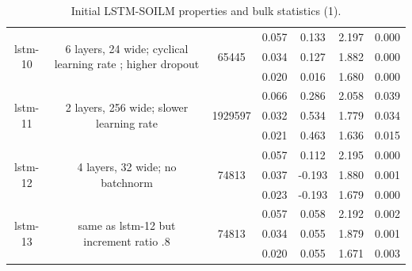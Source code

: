 \begin{table}[H]
\begin{sideways}
\begin{tabular}{c|c|c|c|c|c|c }
\hline
\multirow{3}{6em}{lstm-10} & \multirow{3}{16em}{6 layers, 24 wide; cyclical learning rate ; higher dropout} & \multirow{3}{4em}{65445} & 0.057 & 0.133 & 2.197 & 0.000 \\ & & & 0.034 & 0.127 & 1.882 & 0.000 \\ & & & 0.020 & 0.016 & 1.680 & 0.000 \\
\hline
\multirow{3}{6em}{lstm-11} & \multirow{3}{16em}{2 layers, 256 wide; slower learning rate} & \multirow{3}{4em}{1929597} & 0.066 & 0.286 & 2.058 & 0.039 \\ & & & 0.032 & 0.534 & 1.779 & 0.034 \\ & & & 0.021 & 0.463 & 1.636 & 0.015 \\
\hline
\multirow{3}{6em}{lstm-12} & \multirow{3}{16em}{4 layers, 32 wide; no batchnorm} & \multirow{3}{4em}{74813} & 0.057 & 0.112 & 2.195 & 0.000 \\ & & & 0.037 & -0.193 & 1.880 & 0.001 \\ & & & 0.023 & -0.193 & 1.679 & 0.000 \\
\hline
\multirow{3}{6em}{lstm-13} & \multirow{3}{16em}{same as lstm-12 but increment ratio .8} & \multirow{3}{4em}{74813} & 0.057 & 0.058 & 2.192 & 0.002 \\ & & & 0.034 & 0.055 & 1.879 & 0.001 \\ & & & 0.020 & 0.055 & 1.671 & 0.003 \\
    \end{tabular}
\centering
\end{sideways}
    \caption{Initial LSTM-SOILM properties and bulk statistics (1).}
    \label{model-init-lstm-table-1}
\end{table}

